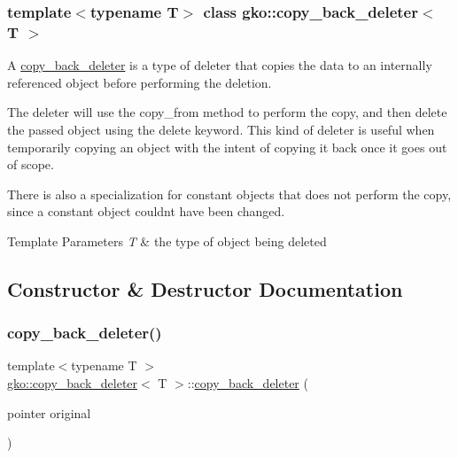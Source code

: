 \subsubsection*{template$<$typename T$>$\newline
class gko\+::copy\+\_\+back\+\_\+deleter$<$ T $>$}

A \hyperlink{classgko_1_1copy__back__deleter}{copy\+\_\+back\+\_\+deleter} is a type of deleter that copies the data to an internally referenced object before performing the deletion. 

The deleter will use the {\ttfamily copy\+\_\+from} method to perform the copy, and then delete the passed object using the {\ttfamily delete} keyword. This kind of deleter is useful when temporarily copying an object with the intent of copying it back once it goes out of scope.

There is also a specialization for constant objects that does not perform the copy, since a constant object couldn\textquotesingle{}t have been changed.


\begin{DoxyTemplParams}{Template Parameters}
{\em T} & the type of object being deleted \\
\hline
\end{DoxyTemplParams}


\subsection{Constructor \& Destructor Documentation}
\mbox{\label{classgko_1_1copy__back__deleter_affa618330dcb3a4e3aeaffb69c39df5f}} 
\subsubsection{\texorpdfstring{copy\+\_\+back\+\_\+deleter()}{copy\_back\_deleter()}}
{\footnotesize\ttfamily template$<$typename T $>$ \\
\hyperlink{classgko_1_1copy__back__deleter}{gko\+::copy\+\_\+back\+\_\+deleter}$<$ T $>$\+::\hyperlink{classgko_1_1copy__back__deleter}{copy\+\_\+back\+\_\+deleter} (\begin{DoxyParamCaption}\item[{pointer}]{original }\end{DoxyParamCaption})}



